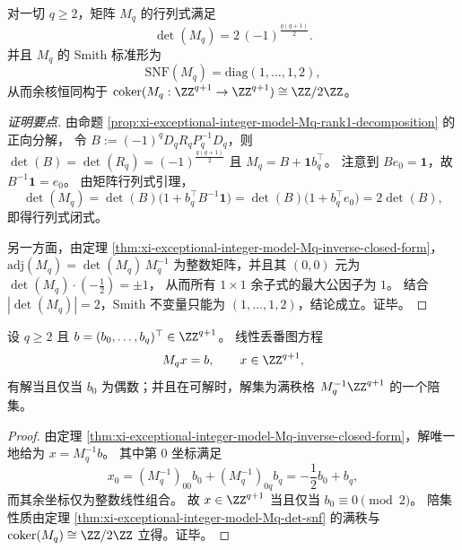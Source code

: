 \begin{theorem}\label{thm:xi-exceptional-integer-model-Mq-det-snf}
对一切 \(q\ge 2\)，矩阵 \(M_q\) 的行列式满足
\[
\boxed{\;\det(M_q)=2\,(-1)^{\frac{q(q+1)}{2}}.\;}
\]
并且 \(M_q\) 的 Smith 标准形为
\[
\boxed{\;\mathrm{SNF}(M_q)=\mathrm{diag}(1,\dots,1,2),\;}
\]
从而余核恒同构于 \(\mathrm{coker}(M_q:\ZZ^{q+1}\to\ZZ^{q+1})\cong\ZZ/2\ZZ\)。
\end{theorem}
\begin{proof}[证明要点]
由命题 \ref{prop:xi-exceptional-integer-model-Mq-rank1-decomposition} 的正向分解，
令 \(B:=(-1)^qD_qR_qP_q^{-1}D_q\)，则 \(\det(B)=\det(R_q)=(-1)^{\frac{q(q+1)}{2}}\) 且 \(M_q=B+\mathbf 1 b_q^{\top}\)。
注意到 \(Be_0=\mathbf 1\)，故 \(B^{-1}\mathbf 1=e_0\)。
由矩阵行列式引理，
\[
\det(M_q)=\det(B)\bigl(1+b_q^{\top}B^{-1}\mathbf 1\bigr)
=\det(B)\bigl(1+b_q^{\top}e_0\bigr)
=2\det(B),
\]
即得行列式闭式。
\par
另一方面，由定理 \ref{thm:xi-exceptional-integer-model-Mq-inverse-closed-form}，
\(\mathrm{adj}(M_q)=\det(M_q)\,M_q^{-1}\) 为整数矩阵，并且其 \((0,0)\) 元为
\(\det(M_q)\cdot(-\tfrac12)=\pm1\)，
从而所有 \(1\times 1\) 余子式的最大公因子为 \(1\)。
结合 \(|\det(M_q)|=2\)，Smith 不变量只能为 \((1,\dots,1,2)\)，结论成立。证毕。
\end{proof}

\begin{corollary}\label{cor:xi-exceptional-integer-model-Mq-diophantine-parity}
设 \(q\ge 2\) 且 \(b=(b_0,\dots,b_q)^{\top}\in\ZZ^{q+1}\)。
线性丢番图方程
\[
M_qx=b,\qquad x\in\ZZ^{q+1},
\]
有解当且仅当 \(b_0\) 为偶数；并且在可解时，解集为满秩格 \(M_q^{-1}\ZZ^{q+1}\) 的一个陪集。
\end{corollary}
\begin{proof}
由定理 \ref{thm:xi-exceptional-integer-model-Mq-inverse-closed-form}，解唯一地给为 \(x=M_q^{-1}b\)。
其中第 \(0\) 坐标满足
\[
x_0=(M_q^{-1})_{00}b_0+(M_q^{-1})_{0q}b_q=-\frac12 b_0+b_q,
\]
而其余坐标仅为整数线性组合。
故 \(x\in\ZZ^{q+1}\) 当且仅当 \(b_0\equiv 0\pmod 2\)。
陪集性质由定理 \ref{thm:xi-exceptional-integer-model-Mq-det-snf} 的满秩与 \(\mathrm{coker}(M_q)\cong\ZZ/2\ZZ\) 立得。证毕。
\end{proof}

